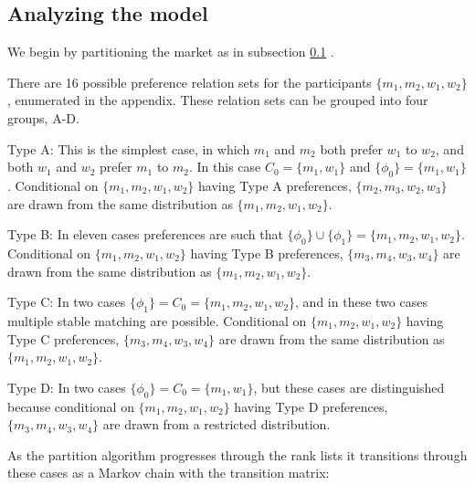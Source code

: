 \documentclass[WP]{AEA}
\begin{document}
\subsection{Analyzing the model} \label{subsect:partition}

We begin by partitioning the market as in subsection \ref{subsect:partition} . 

There are 16 possible preference relation sets for the participants $\{m_1,m_2,w_1,w_2\}$, enumerated in the appendix. These relation sets can be grouped into four groups, A-D.

Type A: This is the simplest case, in which $m_1$ and $m_2$ both prefer $w_1$ to $w_2$, and both $w_1$ and $w_2$ prefer $m_1$ to $m_2$.  In this case $C_0 =\{m_1,w_1\}$ and $\{\phi_0\}=\{m_1,w_1\}$. 
Conditional on $\{m_1,m_2,w_1,w_2\}$ having Type A preferences, $\{m_2,m_3,w_2,w_3\}$ are drawn from the same distribution as $\{m_1,m_2,w_1,w_2\}$.  

Type B: In eleven cases preferences are such that $ \{\phi_0\} \cup \{\phi_1\}=\{m_1,m_2,w_1,w_2\} $.
Conditional on $\{m_1,m_2,w_1,w_2\}$ having Type B preferences, $\{m_3,m_4,w_3,w_4\}$ are drawn from the same distribution as $\{m_1,m_2,w_1,w_2\}$.  

Type C: In two cases  $\{\phi_1\}=C_0 = \{m_1,m_2,w_1,w_2\}$, and in these two cases multiple stable matching are possible.  Conditional on $\{m_1,m_2,w_1,w_2\}$ having Type C preferences, $\{m_3,m_4,w_3,w_4\}$ are drawn from the same distribution as $\{m_1,m_2,w_1,w_2\}$.  

Type D: In two cases $\{\phi_0\}= C_0=\{m_1,w_1\}$, but these cases are distinguished because conditional on $\{m_1,m_2,w_1,w_2\}$ having Type D preferences, $\{m_3,m_4,w_3,w_4\}$ are drawn from  a restricted distribution.

As the partition algorithm progresses through the rank lists it transitions through these cases as a Markov chain with the transition matrix:
\end{document}
